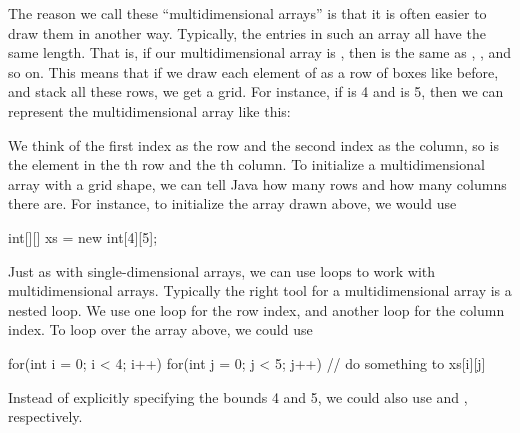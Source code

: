 The reason we call these ``multidimensional arrays'' is that it is often easier to draw them in another way. Typically, the entries in such an array all have the same length. That is, if our multidimensional array is , then  is the same as , , and so on. This means that if we draw each element of  as a row of boxes like before, and stack all these rows, we get a grid. For instance, if  is 4 and  is 5, then we can represent the multidimensional array like this:
\begin{center}
\end{center}
We think of the first index as the row and the second index as the column, so  is the element in the th row and the th column. To initialize a multidimensional array with a grid shape, we can tell Java how many rows and how many columns there are. For instance, to initialize the array  drawn above, we would use
\begin{code}
int[][] xs = new int[4][5];
\end{code}

Just as with single-dimensional arrays, we can use  loops to work with multidimensional arrays. Typically the right tool for a multidimensional array is a nested  loop. We use one  loop for the row index, and another  loop for the column index. To loop over the  array above, we could use
\begin{code}
for(int i = 0; i < 4; i++) {
    for(int j = 0; j < 5; j++) {
        // do something to xs[i][j]
    }
}
\end{code}
Instead of explicitly specifying the bounds 4 and 5, we could also use  and , respectively.

